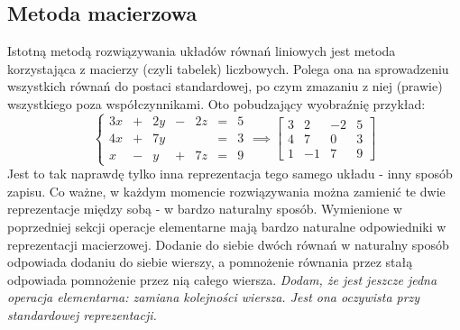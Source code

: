 \documentclass{article}
\theoremstyle{remark}
\begin{document}
\subsection{Metoda macierzowa}
Istotną metodą rozwiązywania układów równań liniowych jest metoda korzystająca
z macierzy (czyli tabelek) liczbowych.
Polega ona na sprowadzeniu wszystkich równań do postaci standardowej, po czym
zmazaniu z niej (prawie) wszystkiego poza współczynnikami. Oto pobudzający wyobraźnię przykład:
\[
  \left\{
    \begin{array}{lllllll}
      3x &+& 2y &-& 2z &=& 5\\
      4x &+& 7y && &=& 3\\
      x &-& y &+& 7z &=& 9
    \end{array}
  \right. \implies \left[
    \begin{array}{lll|l}
      3 & 2 &- 2 & 5\\
      4 & 7 &  0  & 3\\
      1 &- 1 & 7 & 9
    \end{array}
  \right]
\]
Jest to tak naprawdę tylko inna reprezentacja tego samego układu - inny sposób zapisu.
Co ważne, w każdym momencie rozwiązywania można zamienić te dwie reprezentacje
między sobą - w bardzo naturalny sposób. Wymienione w poprzedniej sekcji operacje elementarne 
mają bardzo naturalne odpowiedniki w reprezentacji macierzowej.
Dodanie do siebie dwóch równań w naturalny sposób odpowiada dodaniu do siebie
wierszy, a pomnożenie równania przez stałą odpowiada pomnożenie przez nią całego wiersza.
\textit{Dodam, że jest jeszcze jedna operacja elementarna: zamiana kolejności wiersza. 
Jest ona oczywista przy standardowej reprezentacji.}
\end{document}
